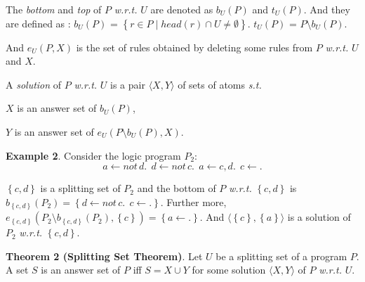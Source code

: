 \documentclass[landscape,final,a0paper,fontscale=0.285]{baposter}
\newtheorem{theorem}{Theorem}
\newenvironment{tight_itemize}{
\begin{itemize}
   \setlength{\itemsep}{0pt}%
  \setlength{\topsep}{0pt}%
  \setlength{\partopsep}{0pt}%
  \setlength{\parskip}{0pt}%
  \setlength{\parsep}{0pt}%
}{\end{itemize}}
\newcommand\st{{\it s.t. }}
\newcommand\wrt{{\it w.r.t. }}
\newcommand{\set}[1]{\left\{#1\right\}}
\newcommand{\Not}{not \,}
\begin{document}
\begin{poster}
{    %
    The {\em bottom} and {\em top} of $P$ \wrt $U$ are denoted as $b_U(P)$  and $t_U(P)$. And they are defined as :
    $b_U(P)$ = $\set{ r \in P \mid head(r) \cap U \neq \emptyset }$.
    $t_U(P)$ = $P\setminus b_U(P)$.
    \par
    And $e_U(P, X)$ is the set of rules obtained by deleting some rules from $P$ \wrt $U$ and $X$.

    \par
    A {\em solution} of $P$ \wrt $U$ is a pair $\langle X, Y\rangle$ of sets of atoms \st
    \begin{tight_itemize}
      \item $X$ is an answer set of $b_U(P)$,
      \item $Y$ is an answer set of $e_U(P\setminus b_U(P), X)$.
    \end{tight_itemize}

    \smallskip
    {\bf Example 2}. Consider the logic program $P_2$:
     \[   a \gets \Not d.\ \ d \gets \Not c.\ \ a \gets c, d.\ \ c \gets .
     \]
    \par
    $\set{c, d}$ is a splitting set of $P_2$ and the bottom of $P$ \wrt $\set{c,d}$ is $b_{\set{c, d}}(P_2) = \set{ d\gets\Not c.\ \ c\gets.}$. Further more, $e_{\set{c,d}}(P_2\setminus b_{\set{c,d}}(P_2), \set{c}) = \set{ a\gets.}$. And $\langle \set{c}, \set{a}\rangle$ is a solution of $P_2$ \wrt $\set{c,d}$.

    \par
    {\bf Theorem 2 (Splitting Set Theorem)}. Let $U$ be a splitting set of a program $P$. A set $S$ is an answer set of $P$ iff $S = X\cup Y$ for some solution $\langle X, Y\rangle$ of $P$ \wrt $U$.

  }
\end{poster}
\end{document}
